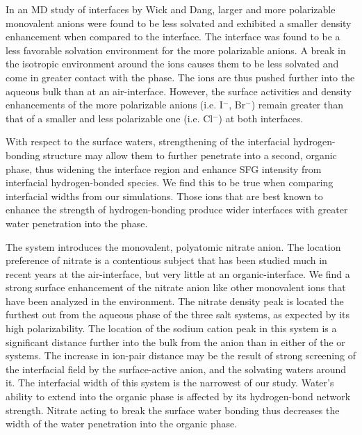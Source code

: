 In an MD study of \ctcwat interfaces by Wick and Dang,\cite{Wick2007a} larger and more polarizable monovalent anions were found to be less solvated and exhibited a smaller density enhancement when compared to the \airwat interface. The \ctcwat interface was found to be a less favorable solvation environment for the more polarizable anions. A break in the isotropic environment around the ions causes them to be less solvated and come in greater contact with the \ctc phase. The ions are thus pushed further into the aqueous bulk than at an air-interface. However, the surface activities and density enhancements of the more polarizable anions (i.e. I$^-$, Br$^-$) remain greater than that of a smaller and less polarizable one (i.e. Cl$^-$) at both interfaces. 

With respect to the surface waters, strengthening of the interfacial hydrogen-bonding structure may allow them to further penetrate into a second, organic phase, thus widening the interface region and enhance SFG intensity from interfacial hydrogen-bonded species. We find this to be true when comparing interfacial widths from our simulations. Those ions that are best known to enhance the strength of hydrogen-bonding produce wider interfaces with greater water penetration into the \ctc phase.

The \sodnit system introduces the monovalent, polyatomic nitrate anion. The location preference of nitrate is a contentious subject that has been studied much in recent years at the air-\wat interface,\cite{Brown2009,Thomas2007} but very little at an organic-\wat interface. We find a strong surface enhancement of the nitrate anion like other monovalent ions that have been analyzed in the \ctcwat environment.\cite{Wick2007a} The nitrate density peak is located the furthest out from the aqueous phase of the three salt systems, as expected by its high polarizability. The location of the sodium cation peak in this system is a significant distance further into the bulk from the anion than in either of the \nacl or \sodsul systems. The increase in ion-pair distance may be the result of strong screening of the interfacial field by the surface-active anion, and the solvating waters around it. The interfacial width of this system is the narrowest of our study. Water's ability to extend into the organic phase is affected by its hydrogen-bond network strength. Nitrate acting to break the surface water bonding thus decreases the width of the water penetration into the organic phase. 

